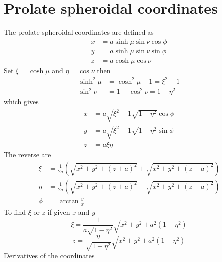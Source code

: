 \documentclass[a4paper,10pt]{article}
\numberwithin{equation}{section}
\begin{document}
\section{Prolate spheroidal coordinates}
  The prolate spheroidal coordinates are defined as
  \begin{equation}\begin{split}
    x &= a \sinh{\mu}\sin{\nu}\cos{\phi}\\
    y &= a \sinh{\mu}\sin{\nu}\sin{\phi}\\
    z &= a \cosh{\mu}\cos{\nu}
  \end{split}\end{equation}
  Set \(\xi = \cosh{\mu}\) and \(\eta = \cos{\nu}\) then
  \begin{equation}\begin{split}
    \sinh^2{\mu} &= \cosh^2{\mu} - 1 = \xi^2 - 1\\
    \sin^2{\nu}  &= 1 - \cos^2{\nu} = 1 - \eta^2
  \end{split}\end{equation}
  which gives
  \begin{equation}\begin{split}
    x &= a \sqrt{\xi^2-1}\sqrt{1-\eta^2} \cos{\phi}\\
    y &= a \sqrt{\xi^2-1}\sqrt{1-\eta^2} \sin{\phi}\\
    z &= a \xi \eta
  \end{split}\end{equation}
  The reverse are
  \begin{equation}\begin{split}
    \xi &= \frac{1}{2a} \left( \sqrt{x^2 + y^2 + (z+a)^2} + \sqrt{x^2 + y^2 + (z-a)^2} \right)\\
    \eta &= \frac{1}{2a} \left( \sqrt{x^2 + y^2 + (z+a)^2} - \sqrt{x^2 + y^2 + (z-a)^2} \right)\\
    \phi &= \arctan{\frac{y}{x}}
  \end{split}\end{equation}
  To find \(\xi\) or \(z\) if given \(x\) and \(y\)
  \begin{equation}
    \xi = \frac{1}{a\sqrt{1-\eta^2}}\sqrt{x^2 + y^2 + a^2(1-\eta^2)}
  \end{equation}
  \begin{equation}
    z = \frac{\eta}{\sqrt{1-\eta^2}}\sqrt{x^2 + y^2 + a^2(1-\eta^2)}
  \end{equation}
  Derivatives of the coordinates
\end{document}
